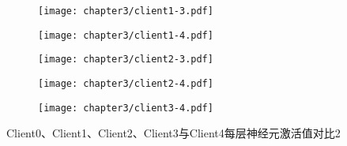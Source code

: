 \begin{figure}[thbp]  
    \centering  
    \begin{subfigure}[b]{\textwidth}
        \centering
        \texttt{[image: chapter3/client1-3.pdf]}
        \label{fig:3-1client1-3}
    \end{subfigure}

    \vspace{0.3cm} %
    
    \begin{subfigure}[b]{\textwidth}
        \centering
        \texttt{[image: chapter3/client1-4.pdf]}
        \label{fig:3-1client1-4}
    \end{subfigure}
    
    \vspace{0.3cm} %
    
    \begin{subfigure}[b]{\textwidth}
        \centering
        \texttt{[image: chapter3/client2-3.pdf]}
        \label{fig:3-1client2-3}
    \end{subfigure}
    
    \vspace{0.3cm} %
    
    \begin{subfigure}[b]{\textwidth}
        \centering
        \texttt{[image: chapter3/client2-4.pdf]}
        \label{fig:3-1client2-4}
    \end{subfigure}
    
    \vspace{0.3cm} %
    
    \begin{subfigure}[b]{\textwidth}
        \centering
        \texttt{[image: chapter3/client3-4.pdf]}
        \label{fig:3-1client3-4}
    \end{subfigure}
    
    \vspace{0.2cm}
    \caption{Client0、Client1、Client2、Client3与Client4每层神经元激活值对比2}
    \label{fig:compare-clients1}
\end{figure}

